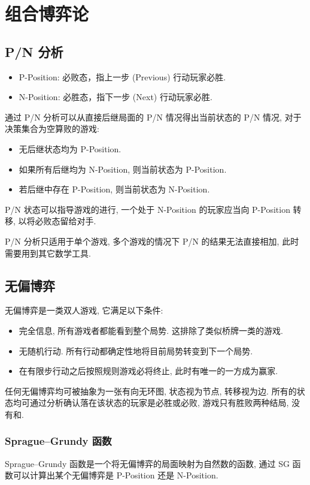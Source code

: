 \clearpage \section{组合博弈论}
\subsection{P/N 分析}
\begin{itemize}
  \item P-Position: 必败态，指上一步 (Previous) 行动玩家必胜.
  \item N-Position: 必胜态，指下一步 (Next) 行动玩家必胜.
\end{itemize}

通过 P/N 分析可以从直接后继局面的 P/N 情况得出当前状态的 P/N 情况, 对于决策集合为空算败的游戏:

\begin{itemize}
  \item 无后继状态均为 P-Position.
  \item 如果所有后继均为 N-Position, 则当前状态为 P-Position.
  \item 若后继中存在 P-Position, 则当前状态为 N-Position.
\end{itemize}

P/N 状态可以指导游戏的进行, 一个处于 N-Position 的玩家应当向 P-Position 转移, 以将必败态留给对手.

P/N 分析只适用于单个游戏, 多个游戏的情况下 P/N 的结果无法直接相加, 此时需要用到其它数学工具.

\subsection{无偏博弈}
无偏博弈是一类双人游戏, 它满足以下条件:

\begin{itemize}
  \item 完全信息, 所有游戏者都能看到整个局势. 这排除了类似桥牌一类的游戏.
  \item 无随机行动. 所有行动都确定性地将目前局势转变到下一个局势.
  \item 在有限步行动之后按照规则游戏必将终止, 此时有唯一的一方成为赢家.
\end{itemize}

任何无偏博弈均可被抽象为一张有向无环图, 状态视为节点, 转移视为边. 所有的状态均可通过分析确认落在该状态的玩家是必胜或必败, 游戏只有胜败两种结局, 没有和.

\subsubsection{Sprague–Grundy 函数}
Sprague–Grundy 函数是一个将无偏博弈的局面映射为自然数的函数, 通过 SG 函数可以计算出某个无偏博弈是 P-Position 还是 N-Position.

